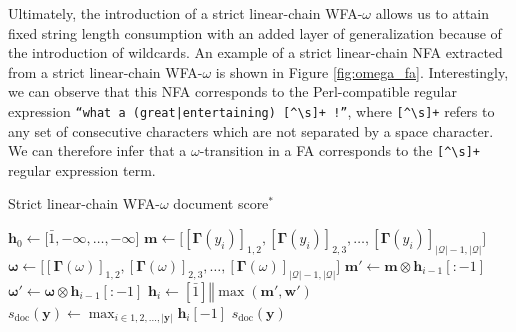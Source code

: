 Ultimately, the introduction of a strict linear-chain WFA-$\omega$ allows us to
attain fixed string length consumption with an added layer of generalization
because of the introduction of wildcards. An example of a strict linear-chain
NFA extracted from a strict linear-chain WFA-$\omega$ is shown in Figure
\ref{fig:omega_fa}. Interestingly, we can observe that this NFA corresponds to
the Perl-compatible regular expression \texttt{``what a (great|entertaining)
  [\^{}\textbackslash s]+ !''}, where
\texttt{[\^{}\textbackslash s]+} refers to any set of consecutive
characters which are not separated by a space character. We can therefore infer
that a $\omega$-transition in a FA corresponds to the
\texttt{[\^{}\textbackslash s]+} regular expression term.

\begin{algorithm}[t!]
  \small
  \caption{Strict linear-chain WFA-$\omega$ document score$^*$}
  \label{algo:lc_wfa_w_document_score}
  \begin{algorithmic}[1]
    \Statex
    \State $\bm{h}_0 \gets \big[\bar{1}, -\infty, \ldots, -\infty\big]$ 
     
    \State $\bm{m} \gets \big[[\bm{\Gamma}(y_i)]_{1,2}, [\bm{\Gamma}(y_i)]_{2,3}, \ldots,
    [\bm{\Gamma}(y_i)]_{|\mathcal{Q}|-1,|\mathcal{Q}|}\big]$ 
    \State $\bm{\omega} \gets \big[[\bm{\Gamma}(\omega)]_{1,2}, [\bm{\Gamma}(\omega)]_{2,3}, \ldots,
    [\bm{\Gamma}(\omega)]_{|\mathcal{Q}|-1,|\mathcal{Q}|}\big]$
    \State $\bm{m'} \gets \bm{m} \otimes \bm{h}_{i-1}[:-1]$ 
    \State $\bm{\omega'} \gets \bm{\omega} \otimes \bm{h}_{i-1}[:-1]$ 
    \State $\bm{h}_{i} \gets [\bar{1}] \mathbin\Vert \max(\bm{m'}, \bm{w'})$
    \EndFor
    \State $s_{\text{doc}}(\bm{y}) \gets  \max_{i \in 1,2,...,|\bm{y}|}
    \bm{h}_{i}[-1]$
    \State \Return $s_{\text{doc}}(\bm{y})$
    \EndFunction
  \end{algorithmic}
\end{algorithm}

